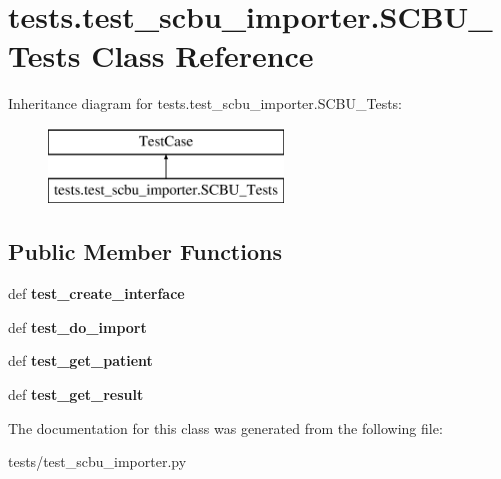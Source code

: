 \hypertarget{classtests_1_1test__scbu__importer_1_1_s_c_b_u___tests}{\section{tests.\-test\-\_\-scbu\-\_\-importer.\-S\-C\-B\-U\-\_\-\-Tests Class Reference}
\label{classtests_1_1test__scbu__importer_1_1_s_c_b_u___tests}
}
Inheritance diagram for tests.\-test\-\_\-scbu\-\_\-importer.\-S\-C\-B\-U\-\_\-\-Tests\-:\begin{figure}[H]
\begin{center}
\leavevmode
\includegraphics[height=2.000000cm]{classtests_1_1test__scbu__importer_1_1_s_c_b_u___tests}
\end{center}
\end{figure}
\subsection*{Public Member Functions}
\begin{DoxyCompactItemize}
\item 
\hypertarget{classtests_1_1test__scbu__importer_1_1_s_c_b_u___tests_ab8af92926a6380a42bb7ab9134a285aa}{def {\bfseries test\-\_\-create\-\_\-interface}}\label{classtests_1_1test__scbu__importer_1_1_s_c_b_u___tests_ab8af92926a6380a42bb7ab9134a285aa}

\item 
\hypertarget{classtests_1_1test__scbu__importer_1_1_s_c_b_u___tests_a4c19309db2aa8dfb7729b88931cd593a}{def {\bfseries test\-\_\-do\-\_\-import}}\label{classtests_1_1test__scbu__importer_1_1_s_c_b_u___tests_a4c19309db2aa8dfb7729b88931cd593a}

\item 
\hypertarget{classtests_1_1test__scbu__importer_1_1_s_c_b_u___tests_a1153264d145476558e4b319df768cdf6}{def {\bfseries test\-\_\-get\-\_\-patient}}\label{classtests_1_1test__scbu__importer_1_1_s_c_b_u___tests_a1153264d145476558e4b319df768cdf6}

\item 
\hypertarget{classtests_1_1test__scbu__importer_1_1_s_c_b_u___tests_ad1050524ac28f979e7a76788fd846424}{def {\bfseries test\-\_\-get\-\_\-result}}\label{classtests_1_1test__scbu__importer_1_1_s_c_b_u___tests_ad1050524ac28f979e7a76788fd846424}

\end{DoxyCompactItemize}


The documentation for this class was generated from the following file\-:\begin{DoxyCompactItemize}
\item 
tests/test\-\_\-scbu\-\_\-importer.\-py\end{DoxyCompactItemize}
